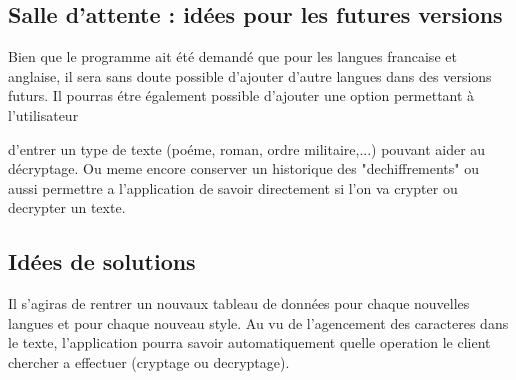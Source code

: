 \documentclass[a4]{article}
\begin{document}
		\subsection{Salle d’attente : idées pour les futures versions}
			Bien que le programme ait été demandé que pour les langues francaise et anglaise, 
			il sera sans doute possible d'ajouter d'autre langues dans des versions futurs. 
			Il pourras étre également possible d'ajouter une option permettant à l'utilisateur

			d'entrer un type de texte (poéme, roman, ordre militaire,...) pouvant aider au décryptage. Ou meme encore conserver un historique des "dechiffrements" ou aussi permettre a l'application de savoir directement si l'on va crypter ou decrypter un texte.

		\subsection{Idées de solutions}
		 	Il s'agiras de rentrer un nouvaux tableau de données pour chaque nouvelles langues et pour 
			chaque nouveau style.
			Au vu de l'agencement des caracteres dans le texte, l'application pourra savoir automatiquement quelle operation le client chercher a effectuer (cryptage ou decryptage).
\end{document}
